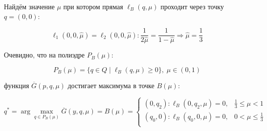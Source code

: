 \begin{flushleft}
	Найдём значение $\mu$ при котором прямая $\ell_B(q, \mu)$ проходит через точку
	$q=(0,0)$:
	
	$$\ell_1(0,0,\hat \mu) = \ell_2(0,0,\hat \mu) :
	\frac{1}{2\hat \mu}=\frac{1}{1-\hat \mu} 
	\Rightarrow \hat \mu = \frac{1}{3}$$	
	
	Очевидно, что на полиэдре $P_B(\mu):$
		
	$$P_B(\mu)=\{q \in Q \; | 
	\;  \ell_B(q, \mu) \geqslant 0 \}, \; \mu \in (0,1)$$
	
	функция $\overline{G}(p,q,\mu)$ достигает максимума в точке $B(\mu):$
	
	$$
	q^* = \arg \max \limits_{q\in P_B(\mu)} \overline G(y,q,\mu) = B(\mu)=
	\begin{cases}
		(0, q_2) : \ell_B(0,q_2,\mu)=0, & \frac{1}{3} \leqslant \mu < 1 \\
		(q_0, 0) : \ell_B(q_0,0,\mu)=0, & 0 < \mu \leqslant \frac{1}{3} \\
	\end{cases}	
	$$
	

\end{flushleft}
